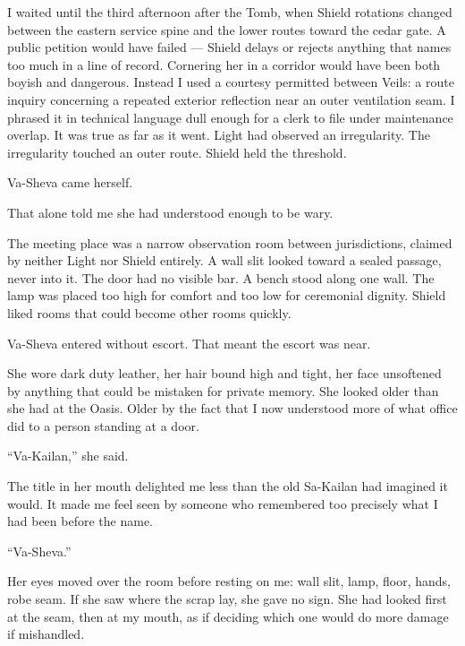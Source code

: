 \ornament

I waited until the third afternoon after the Tomb, when Shield rotations changed between the eastern service spine and the lower routes toward the cedar gate. A public petition would have failed --- Shield delays or rejects anything that names too much in a line of record. Cornering her in a corridor would have been both boyish and dangerous. Instead I used a courtesy permitted between Veils: a route inquiry concerning a repeated exterior reflection near an outer ventilation seam. I phrased it in technical language dull enough for a clerk to file under maintenance overlap. It was true as far as it went. Light had observed an irregularity. The irregularity touched an outer route. Shield held the threshold.\par

Va-Sheva came herself.\par

That alone told me she had understood enough to be wary.\par

The meeting place was a narrow observation room between jurisdictions, claimed by neither Light nor Shield entirely. A wall slit looked toward a sealed passage, never into it. The door had no visible bar. A bench stood along one wall. The lamp was placed too high for comfort and too low for ceremonial dignity. Shield liked rooms that could become other rooms quickly.\par

Va-Sheva entered without escort. That meant the escort was near.\par

She wore dark duty leather, her hair bound high and tight, her face unsoftened by anything that could be mistaken for private memory. She looked older than she had at the Oasis. Older by the fact that I now understood more of what office did to a person standing at a door.\par

``Va-Kailan,'' she said.\par

The title in her mouth delighted me less than the old Sa-Kailan had imagined it would. It made me feel seen by someone who remembered too precisely what I had been before the name.\par

``Va-Sheva.''\par

Her eyes moved over the room before resting on me: wall slit, lamp, floor, hands, robe seam. If she saw where the scrap lay, she gave no sign. She had looked first at the seam, then at my mouth, as if deciding which one would do more damage if mishandled.\par

